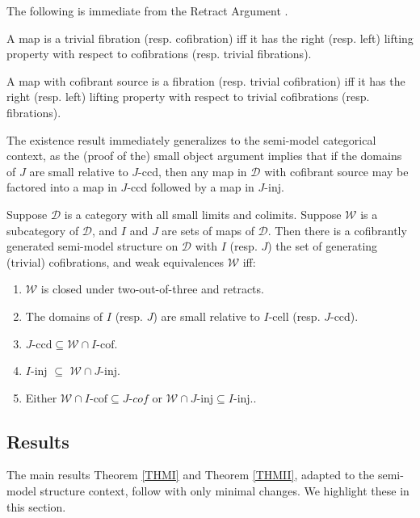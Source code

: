 \documentclass[a4paper,10pt
]{article}%
\renewcommand{\1}{\eta}%
\begin{document}
The following is immediate from the Retract Argument \cite[Lemma 1.1.9]{Hov99}.
\begin{lemma}
	A map is a trivial fibration (resp. cofibration) iff it has the right (resp. left) lifting property with respect to cofibrations (resp. trivial fibrations).
	
	A map with cofibrant source is a fibration (resp. trivial cofibration) iff it has the right (resp. left) lifting property with respect to trivial cofibrations (resp. fibrations).
\end{lemma}

The existence result \cite[Theorem 2.1.19]{Hov99} immediately generalizes to the semi-model categorical context,
as the (proof of the) small object argument \cite[Lemma 2.1.14]{Hov99} implies that
if the domains of $J$ are small relative to $J$-ccd,
then any map in $\mathcal D$ with cofibrant source may be factored into a map in $J$-ccd followed by a map in $J$-inj.
\begin{theorem}\label{SEMIMS_THM}
	Suppose $\mathcal D$ is a category with all small limits and colimits.
	Suppose $\mathcal W$ is a subcategory of $\mathcal D$, and $I$ and $J$ are sets of maps of $\mathcal D$.
	Then there is a cofibrantly generated semi-model structure on $\mathcal D$ with
	$I$ (resp. $J$) the set of generating (trivial) cofibrations, and weak equivalences $\mathcal W$ iff:
	\begin{enumerate}[label = (\roman*)]
		\item $\mathcal W$ is closed under two-out-of-three and retracts.
		\item The domains of $I$ (resp. $J$) are small relative to $I$-cell (resp. $J$-ccd).
		\item $J\text{-ccd} \subseteq \mathcal W \cap I\text{-cof}$.
		\item $I$-inj $\subseteq$ $\mathcal W \cap J$-inj.
		\item Either $\mathcal W \cap I\text{-cof} \subseteq J\textit{-cof}$ or $\mathcal W \cap J\text{-inj} \subseteq I\text{-inj}.$.
	\end{enumerate}
\end{theorem}


\subsection{Results}

The main results Theorem \ref{THMI} and Theorem \ref{THMII}, adapted to the semi-model structure context, follow with only minimal changes.
We highlight these in this section.
\end{document}
